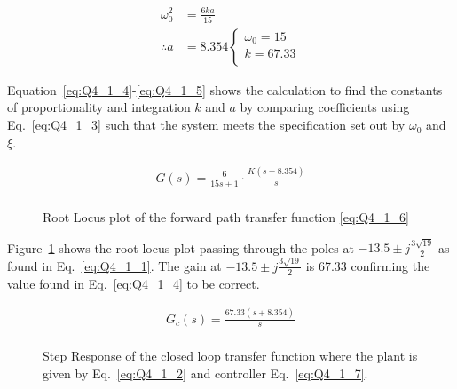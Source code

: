 \begin{equation}
    \begin{split}
        \omega_{0}^{2} &= \frac{6ka}{15}\\
        \therefore a &= 8.354    \begin{cases}
            \omega_0 = 15 \\
            k = 67.33 \\
        \end{cases}
    \end{split}\label{eq:Q4_1_5}
\end{equation}

Equation~\eqref{eq:Q4_1_4}-\eqref{eq:Q4_1_5} shows the calculation to find the constants of proportionality and integration $k$ and $a$ by comparing coefficients using Eq.~\eqref{eq:Q4_1_3} such that the system meets the specification set out by $\omega_0$ and $\xi$.

\begin{equation}
    \begin{split}
        G\left(s\right)= \frac{6}{15s+1}\cdot\frac{K\left(s+8.354\right)}{s}\\
    \end{split}\label{eq:Q4_1_6}
\end{equation}

\renewcommand{\ex}{Q4_1} 

\begin{figure}[ht!]
    \centering
    
    \caption{Root Locus plot of the forward path transfer function \eqref{eq:Q4_1_6} \appendixamble{\ex}}
    \label{fig:\ex}
\end{figure}\FloatBarrier

Figure~\ref{fig:\ex} shows the root locus plot passing through the poles at $-13.5\pm j\frac{3\sqrt{19}}{2}$ as found in Eq.~\eqref{eq:Q4_1_1}. The gain at  $-13.5\pm j\frac{3\sqrt{19}}{2}$ is 67.33 confirming the value found in Eq.~\eqref{eq:Q4_1_4} to be correct.

\begin{equation}
    \begin{split}
        G_c\left(s\right)=\frac{67.33\left(s+8.354\right)}{s}\\
    \end{split}\label{eq:Q4_1_7}
\end{equation}

\begin{figure}[ht!]
    \centering
    
    \caption{Step Response of the closed loop transfer function where the plant is given by Eq.~\eqref{eq:Q4_1_2} and controller Eq.~\eqref{eq:Q4_1_7}. \appendixamble{\ex}}
    \label{fig:\ex_1}
\end{figure}\FloatBarrier

